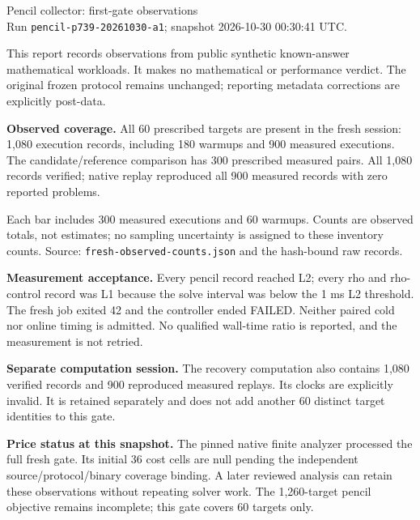 \documentclass[11pt]{article}
\begin{document}
\raggedright\sloppy
{\LARGE Pencil collector: first-gate observations}\\
Run \texttt{pencil-p739-20261030-a1}; snapshot 2026-10-30 00:30:41 UTC.

This report records observations from public synthetic known-answer mathematical workloads. It makes no mathematical or performance verdict. The original frozen protocol remains unchanged; reporting metadata corrections are explicitly post-data.

\textbf{Observed coverage.} All 60 prescribed targets are present in the fresh session: 1,080 execution records, including 180 warmups and 900 measured executions. The candidate/reference comparison has 300 prescribed measured pairs. All 1,080 records verified; native replay reproduced all 900 measured records with zero reported problems.

\begin{center}\end{center}
Each bar includes 300 measured executions and 60 warmups. Counts are observed totals, not estimates; no sampling uncertainty is assigned to these inventory counts. Source: \texttt{fresh-observed-counts.json} and the hash-bound raw records.

\textbf{Measurement acceptance.} Every pencil record reached L2; every rho and rho-control record was L1 because the solve interval was below the 1 ms L2 threshold. The fresh job exited 42 and the controller ended FAILED. Neither paired cold nor online timing is admitted. No qualified wall-time ratio is reported, and the measurement is not retried.

\textbf{Separate computation session.} The recovery computation also contains 1,080 verified records and 900 reproduced measured replays. Its clocks are explicitly invalid. It is retained separately and does not add another 60 distinct target identities to this gate.

\textbf{Price status at this snapshot.} The pinned native finite analyzer processed the full fresh gate. Its initial 36 cost cells are null pending the independent source/protocol/binary coverage binding. A later reviewed analysis can retain these observations without repeating solver work. The 1,260-target pencil objective remains incomplete; this gate covers 60 targets only.
\end{document}
